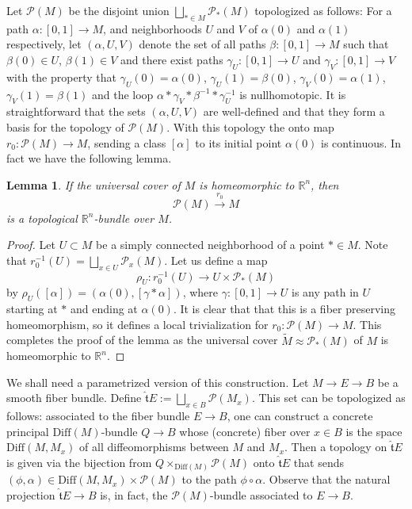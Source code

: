 \documentclass[onecolumn,notitlepage,11pt]{article}
\newcommand{\p}{\mathcal{P}}
\newcommand{\R}{\mathbb{R}}
\newcommand{\Diff}{\mbox{Diff}}
\newcommand{\beq}{\begin{equation*}}
\newcommand{\eeq}{\end{equation*}}
\newtheorem{lemma}{Lemma}[section]
\theoremstyle{definition}
\begin{document}
Let $\p(M)$ be the disjoint union 
$\displaystyle\bigsqcup_{\ast\in M}\p_{\ast}(M)$ topologized as follows:
For a path $\alpha:[0,1]\to M$, and neighborhoods $U$ and $V$ of 
$\alpha(0)$ and $\alpha(1)$ respectively, let 
$(\alpha, U,V)$ denote the set of all paths $\beta:[0,1]\to M$ such
that $\beta(0)\in U$, $\beta(1)\in V$ and there exist paths
$\gamma_U:[0,1]\to U$ and $\gamma_V:[0,1]\to V$ with the property that
$\gamma_U(0)=\alpha(0)$, $\gamma_U(1)=\beta(0)$, 
$\gamma_V(0)=\alpha(1)$, $\gamma_V(1)=\beta(1)$ and the loop
$\alpha\ast\gamma_V\ast\beta^{-1}\ast\gamma_U^{-1}$ is nullhomotopic.
It is straightforward that the sets $(\alpha,U,V)$ are well-defined 
and that they form a basis for the topology
of $\p(M)$. With this topology the onto map $r_0:\p(M)\to M$, sending
a class $[\alpha]$ to its initial point $\alpha(0)$ is continuous. In
fact we have the following lemma.
\begin{lemma}\label{p(M)}
If the universal cover of $M$ is homeomorphic to $\R^n$, then
\beq
\p(M)\xrightarrow{r_0}M
\eeq
is a topological $\R^n$-bundle over $M$.
\end{lemma}
\begin{proof}
Let $U\subset M$ be a simply connected neighborhood of a point $\ast\in M$.
Note that $r_0^{-1}(U)=\bigsqcup_{x\in U}\p_{x}(M)$. Let us define
a map
\beq
\rho_U:r_0^{-1}(U)\to U\times\p_{\ast}(M)
\eeq
by $\rho_U([\alpha])=(\alpha(0),[\gamma\ast\alpha])$, where 
$\gamma:[0,1]\to U$ is any path in $U$ starting at $\ast$ and ending
at $\alpha(0)$. It is clear that that this is a fiber preserving 
homeomorphism, so it defines a local trivialization for 
$r_0:\p(M)\to M$. This completes
the proof of the lemma as the universal cover
$\widetilde{M}\approx\p_{\ast}(M)$ of $M$ is homeomorphic to $\R^n$.
\end{proof}

We shall need a parametrized version of this construction. Let 
$M \to E \to B$ be a smooth fiber bundle. 
Define $\widehat{\mathfrak{t}}E:=
\displaystyle\bigsqcup_{x \in B}\p(M_{x})$. This set
can be topologized as follows: associated to
the fiber bundle $E \to B$, one can construct a concrete
principal $\Diff(M)$-bundle $Q \to B$ 
whose (concrete) fiber over $x \in B$ is the space
$\Diff(M,M_{x})$ of all diffeomorphisms between $M$
and $M_{x}$. Then a topology on $\widehat{\mathfrak{t}}E$  is
given via the bijection from $Q\times_{\Diff(M)}\p(M)$ onto 
$\widehat{\mathfrak{t}}E$ that sends 
$(\phi,\alpha) \in \Diff(M,M_{x})\times \p(M)$ to the path $\phi\circ\alpha$. Observe that the
natural projection $\widehat{\mathfrak{t}}E \to B$ is, in
fact, the 
$\p(M)$-bundle associated to $E \to B$. 
\end{document}
